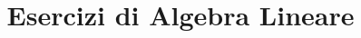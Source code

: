 \documentclass[italian,oneside,headinclude,11pt]{scrreprt}
\begin{document}
\title{Esercizi di Algebra Lineare}
\maketitle

\tableofcontents

% 



\end{document}
